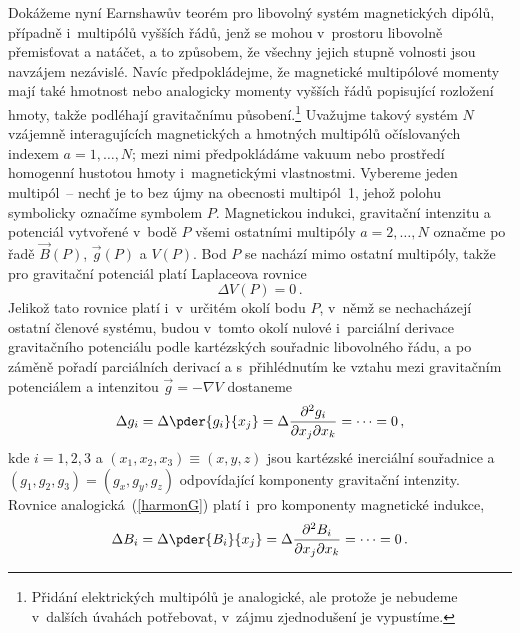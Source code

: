 Dokážeme nyní Earnshawův teorém pro libovolný systém magnetických dipólů,
případně i~multipólů vyšších řádů, jenž se mohou v~prostoru libovolně
přemisťovat a natáčet, a to způsobem, že všechny jejich stupně volnosti jsou
navzájem nezávislé. Navíc předpokládejme, že magnetické multipólové momenty
mají také hmotnost nebo analogicky momenty vyšších řádů popisující rozložení
hmoty, takže podléhají gravitačnímu působení.\footnote{Přidání elektrických
  multipólů je analogické, ale protože je nebudeme v~dalších úvahách
  potřebovat, v~zájmu zjednodušení je vypustíme.} Uvažujme takový systém $N$
vzájemně interagujících magnetických a hmotných multipólů očíslovaných
indexem $a=1,\ldots,N$; mezi nimi předpokládáme vakuum nebo prostředí
homogenní hustotou hmoty i~magnetickými vlastnostmi. Vybereme jeden
multipól~-- nechť je to bez újmy na obecnosti multipól~1, jehož polohu
symbolicky označíme symbolem $P$. Magnetickou indukci, gravitační intenzitu a
potenciál vytvořené v~bodě $P$ všemi ostatními multipóly $a=2,\ldots,N$
označme po řadě $\vec{B}(P)$, $\vec{g}(P)$ a $V(P)$. Bod $P$ se nachází mimo
ostatní multipóly, takže pro gravitační potenciál platí Laplaceova
rovnice~\cite{Gol-Poo-Saf:2002:ClassMech:3}
\begin{equation}
  \Delta V(P) = 0\,.                                             \label{harmonV}
\end{equation}
Jelikož tato rovnice platí i~v~určitém okolí bodu $P$, v~němž se nechacházejí
ostatní členové systému, budou v~tomto okolí nulové i~parciální derivace
gravitačního potenciálu podle kartézských souřadnic libovolného řádu, a po
záměně pořadí parciálních derivací a s~přihlédnutím ke vztahu mezi gravitačním
potenciálem a intenzitou $\vec{g} = -\nabla V$ dostaneme
\begin{equation}
  \Delta g_{i} = \Delta\pder{g_{i}}{x_{j}}
    = \Delta\frac{\partial^{2}g_{i}}{\partial x_{j}\partial x_{k}} = \cdots
    = 0\,,                                                       \label{harmonG}
\end{equation}
kde $i=1,2,3$ a $(x_{1},x_{2},x_{3})\equiv (x,y,z)$ jsou kartézské inerciální
souřadnice a $(g_{1},g_{2},g_{3}) = (g_{x},g_{y},g_{z})$ odpovídající
komponenty gravitační intenzity. Rovnice analogická~(\ref{harmonG}) platí
i~pro komponenty magnetické indukce,
\begin{equation}
  \Delta B_{i} = \Delta\pder{B_{i}}{x_{j}}
    = \Delta\frac{\partial^{2}B_{i}}{\partial x_{j}\partial x_{k}} = \cdots
    = 0\,.                                                       \label{harmonB}
\end{equation}
